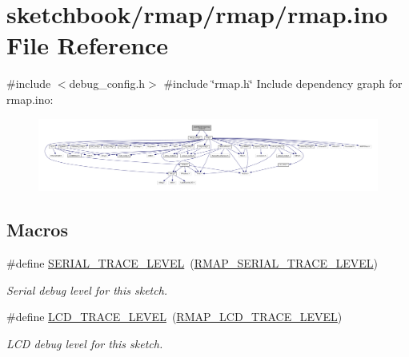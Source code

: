 \hypertarget{rmap_8ino}{}\section{sketchbook/rmap/rmap/rmap.ino File Reference}
\label{rmap_8ino}
{\ttfamily \#include $<$debug\+\_\+config.\+h$>$}\newline
{\ttfamily \#include \char`\"{}rmap.\+h\char`\"{}}\newline
Include dependency graph for rmap.\+ino\+:
\nopagebreak
\begin{figure}[H]
\begin{center}
\leavevmode
\includegraphics[width=350pt]{rmap_8ino__incl}
\end{center}
\end{figure}
\subsection*{Macros}
\begin{DoxyCompactItemize}
\item 
\mbox{\label{rmap_8ino_a31fa5c36fa17c66feec7a67b76c3e786}} 
\#define \hyperlink{rmap_8ino_a31fa5c36fa17c66feec7a67b76c3e786}{S\+E\+R\+I\+A\+L\+\_\+\+T\+R\+A\+C\+E\+\_\+\+L\+E\+V\+EL}~(\hyperlink{debug__config_8h_a911c268100400a6e1b419b0b79396e16}{R\+M\+A\+P\+\_\+\+S\+E\+R\+I\+A\+L\+\_\+\+T\+R\+A\+C\+E\+\_\+\+L\+E\+V\+EL})
\begin{DoxyCompactList}\small\item\em Serial debug level for this sketch. \end{DoxyCompactList}\item 
\mbox{\label{rmap_8ino_acb771fe8deeaa2fee1ad327c0c1be34f}} 
\#define \hyperlink{rmap_8ino_acb771fe8deeaa2fee1ad327c0c1be34f}{L\+C\+D\+\_\+\+T\+R\+A\+C\+E\+\_\+\+L\+E\+V\+EL}~(\hyperlink{debug__config_8h_a86050508a20f5b64f14679edbc3640ab}{R\+M\+A\+P\+\_\+\+L\+C\+D\+\_\+\+T\+R\+A\+C\+E\+\_\+\+L\+E\+V\+EL})
\begin{DoxyCompactList}\small\item\em L\+CD debug level for this sketch. \end{DoxyCompactList}\end{DoxyCompactItemize}
